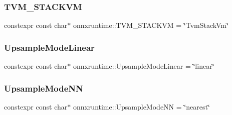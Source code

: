 \subsubsection{\texorpdfstring{T\+V\+M\+\_\+\+S\+T\+A\+C\+K\+VM}{TVM\_STACKVM}}
{\footnotesize\ttfamily constexpr const char$\ast$ onnxruntime\+::\+T\+V\+M\+\_\+\+S\+T\+A\+C\+K\+VM = \char`\"{}Tvm\+Stack\+Vm\char`\"{}}

\mbox{\label{namespaceonnxruntime_a4e73116d10c0f961566ca6634dbd771d}} 
\subsubsection{\texorpdfstring{Upsample\+Mode\+Linear}{UpsampleModeLinear}}
{\footnotesize\ttfamily constexpr const char$\ast$ onnxruntime\+::\+Upsample\+Mode\+Linear = \char`\"{}linear\char`\"{}}

\mbox{\label{namespaceonnxruntime_a3344ca5e754b9d37adc26849338b39e6}} 
\subsubsection{\texorpdfstring{Upsample\+Mode\+NN}{UpsampleModeNN}}
{\footnotesize\ttfamily constexpr const char$\ast$ onnxruntime\+::\+Upsample\+Mode\+NN = \char`\"{}nearest\char`\"{}}

